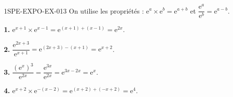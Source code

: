 \begin{corrige}{1SPE-EXPO-EX-013}
On utilise les propriétés : $\mathrm{e}^a \times \mathrm{e}^b = \mathrm{e}^{a+b}$ et $\dfrac{\mathrm{e}^a}{\mathrm{e}^b} = \mathrm{e}^{a-b}$.

\textbf{1.} $\mathrm{e}^{x+1} \times \mathrm{e}^{x-1} = \mathrm{e}^{(x+1)+(x-1)} = \mathrm{e}^{2x}$.

\textbf{2.} $\dfrac{\mathrm{e}^{2x+3}}{\mathrm{e}^{x+1}} = \mathrm{e}^{(2x+3)-(x+1)} = \mathrm{e}^{x+2}$.

\textbf{3.} $\dfrac{\left(\mathrm{e}^x\right)^3}{\mathrm{e}^{2x}} = \dfrac{\mathrm{e}^{3x}}{\mathrm{e}^{2x}} = \mathrm{e}^{3x-2x} = \mathrm{e}^x$.

\textbf{4.} $\mathrm{e}^{x+2} \times \mathrm{e}^{-(x-2)} = \mathrm{e}^{(x+2)+(-x+2)} = \mathrm{e}^{4}$.
\end{corrige}
